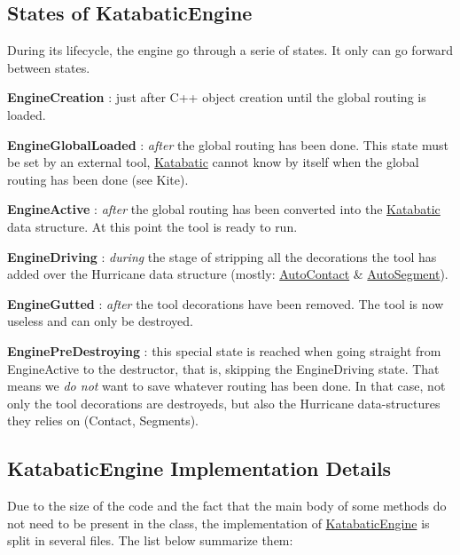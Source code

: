 \hypertarget{classKatabatic_1_1KatabaticEngine_secEngineStates}{}\subsection{States of Katabatic\+Engine}\label{classKatabatic_1_1KatabaticEngine_secEngineStates}
During it\textquotesingle{}s lifecycle, the engine go through a serie of states. It only can go forward between states.
\begin{DoxyItemize}
\item {\bfseries Engine\+Creation} \+: just after C++ object creation until the global routing is loaded.
\item {\bfseries Engine\+Global\+Loaded} \+: {\itshape after} the global routing has been done. This state must be set by an external tool, \mbox{\hyperlink{namespaceKatabatic}{Katabatic}} cannot know by itself when the global routing has been done (see Kite).
\item {\bfseries Engine\+Active} \+: {\itshape after} the global routing has been converted into the \mbox{\hyperlink{namespaceKatabatic}{Katabatic}} data structure. At this point the tool is ready to run.
\item {\bfseries Engine\+Driving} \+: {\itshape during} the stage of stripping all the decorations the tool has added over the Hurricane data structure (mostly\+: \mbox{\hyperlink{classKatabatic_1_1AutoContact}{Auto\+Contact}} \& \mbox{\hyperlink{classKatabatic_1_1AutoSegment}{Auto\+Segment}}).
\item {\bfseries Engine\+Gutted} \+: {\itshape after} the tool decorations have been removed. The tool is now useless and can only be destroyed.
\item {\bfseries Engine\+Pre\+Destroying} \+: this special state is reached when going straight from Engine\+Active to the destructor, that is, skipping the Engine\+Driving state. That means we {\itshape do not} want to save whatever routing has been done. In that case, not only the tool decorations are destroyeds, but also the Hurricane data-\/structures they relies on (Contact, Segments).
\end{DoxyItemize}\hypertarget{classKatabatic_1_1KatabaticEngine_secEngineImpl}{}\subsection{Katabatic\+Engine Implementation Details}\label{classKatabatic_1_1KatabaticEngine_secEngineImpl}
Due to the size of the code and the fact that the main body of some methods do not need to be present in the class, the implementation of \mbox{\hyperlink{classKatabatic_1_1KatabaticEngine}{Katabatic\+Engine}} is split in several files. The list below summarize them\+:
